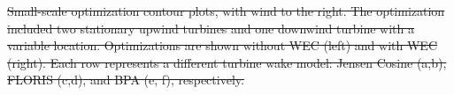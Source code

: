 \documentclass[a4paper]{jpconf}
\providecommand{\DIFdel}[1]{{\protect\color{red}\sout{#1}}}                      %
\providecommand{\DIFdelFL}[1]{\DIFdel{#1}} %
\begin{document}
{%
\DIFdelFL{Small-scale optimization contour plots, with wind to the right. The optimization included two stationary upwind turbines and one downwind turbine with a variable location. Optimizations are shown without WEC (left) and with WEC (right). Each row represents a different turbine wake model: Jensen Cosine (a,b), FLORIS (c,d), and BPA (e, f), respectively.}}
\end{document}
